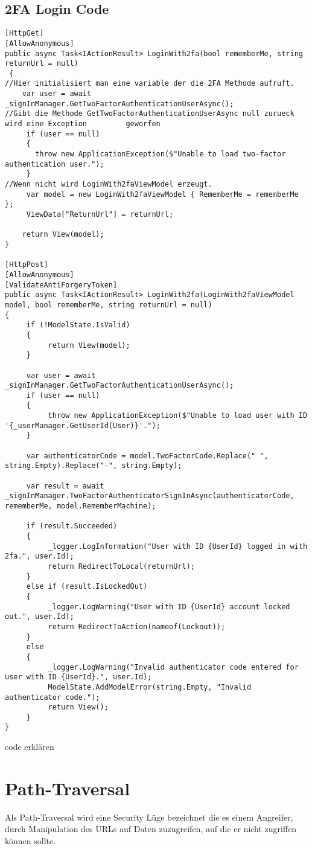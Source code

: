 \subsection{2FA Login Code}
\label{sec:2FALogin}
\begin{lstlisting}
[HttpGet]
[AllowAnonymous]
public async Task<IActionResult> LoginWith2fa(bool rememberMe, string returnUrl = null)
 {
//Hier initialisiert man eine variable der die 2FA Methode aufruft.
    var user = await _signInManager.GetTwoFactorAuthenticationUserAsync();
//Gibt die Methode GetTwoFactorAuthenticationUserAsync null zurueck wird eine Exception 	    geworfen
     if (user == null)
     {
       throw new ApplicationException($"Unable to load two-factor authentication user.");
     }
//Wenn nicht wird LoginWith2faViewModel erzeugt.
     var model = new LoginWith2faViewModel { RememberMe = rememberMe };
     ViewData["ReturnUrl"] = returnUrl;

    return View(model);
}

[HttpPost]
[AllowAnonymous]
[ValidateAntiForgeryToken]
public async Task<IActionResult> LoginWith2fa(LoginWith2faViewModel model, bool rememberMe, string returnUrl = null)
{
     if (!ModelState.IsValid)
     {
          return View(model);
     }

     var user = await _signInManager.GetTwoFactorAuthenticationUserAsync();
     if (user == null)
     {
          throw new ApplicationException($"Unable to load user with ID '{_userManager.GetUserId(User)}'.");
     }

     var authenticatorCode = model.TwoFactorCode.Replace(" ", string.Empty).Replace("-", string.Empty);

     var result = await _signInManager.TwoFactorAuthenticatorSignInAsync(authenticatorCode, rememberMe, model.RememberMachine);

     if (result.Succeeded)
     {
          _logger.LogInformation("User with ID {UserId} logged in with 2fa.", user.Id);
          return RedirectToLocal(returnUrl);
     }
     else if (result.IsLockedOut)
     {
          _logger.LogWarning("User with ID {UserId} account locked out.", user.Id);
          return RedirectToAction(nameof(Lockout));
     }
     else
     {
          _logger.LogWarning("Invalid authenticator code entered for user with ID {UserId}.", user.Id);
          ModelState.AddModelError(string.Empty, "Invalid authenticator code.");
          return View();
     }
}
\end{lstlisting}
code erklären
\section{Path-Traversal}
\label{sec:Path-Traversal}
Als Path-Traversal wird eine Security Lüge bezeichnet die es einem Angreifer, durch Manipulation des URLs auf Daten zuzugreifen, auf die er nicht zugriffen können sollte. 
